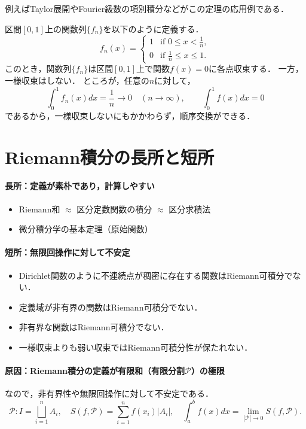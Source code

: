 例えばTaylor展開やFourier級数の項別積分などがこの定理の応用例である．

\begin{example}[一様収束しないが順序交換できる例]
    区間$[0,1]$上の関数列$\{f_n\}$を以下のように定義する．
    \[
    f_n(x) = \begin{cases}
        1 & \text{if } 0 \le x < \frac{1}{n}, \\
        0 & \text{if } \frac{1}{n} \le x \le 1.
    \end{cases}
    \]
    このとき，関数列$\{f_n\}$は区間$[0,1]$上で関数$f(x) = 0$に各点収束する．
    一方，一様収束はしない．
    ところが，任意の$n$に対して，
    \[
    \int_0^1 f_n(x) dx = \frac{1}{n} \to 0 \quad (n \to \infty), \qquad \int_0^1 f(x) dx = 0
    \]
    であるから，一様収束しないにもかかわらず，順序交換ができる．
\end{example}

\section{Riemann積分の長所と短所}

\paragraph{長所：定義が素朴であり，計算しやすい}
\begin{itemize}
    \item Riemann和 $\approx$ 区分定数関数の積分 $\approx$ 区分求積法
    \item 微分積分学の基本定理（原始関数）
\end{itemize}

\paragraph{短所：無限回操作に対して不安定}
\begin{itemize}
    \item Dirichlet関数のように不連続点が稠密に存在する関数はRiemann可積分でない．
    \item 定義域が非有界の関数はRiemann可積分でない．
    \item 非有界な関数はRiemann可積分でない．
    \item 一様収束よりも弱い収束ではRiemann可積分性が保たれない．
\end{itemize}

\paragraph{原因：Riemann積分の定義が有限和（有限分割$\mathcal P$）の極限}
なので，非有界性や無限回操作に対して不安定である．
\[
\mathcal P : I = \bigsqcup_{i=1}^n A_i, \quad S(f,\mathcal P) = \sum_{i=1}^n f(x_i) |A_i|, \quad \int_a^b f(x) dx = \lim_{|\mathcal P| \to 0} S(f,\mathcal P).
\]

